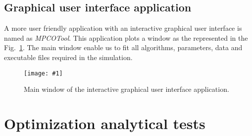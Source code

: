 \documentclass[review,authoryear]{elsarticle}
\newcommand{\FIG}[3]
{
	\begin{figure}[ht!]
		\centering
		\texttt{[image: \#1]}
		\caption{#2.\label{#3}}
	\end{figure}
}
\begin{document}
\subsection{Graphical user interface application}

A more user friendly application with an interactive graphical user interface is
named as \emph{MPCOTool}. This application plots a window as the represented
in the Fig.~\ref{FigWindow}. The main window enable us to fit all algorithms,
parameters, data and executable files required in the simulation.
\FIG{mpcotool-en.eps}{Main window of the interactive graphical user interface
application}{FigWindow}

\section{Optimization analytical tests}
\end{document}
